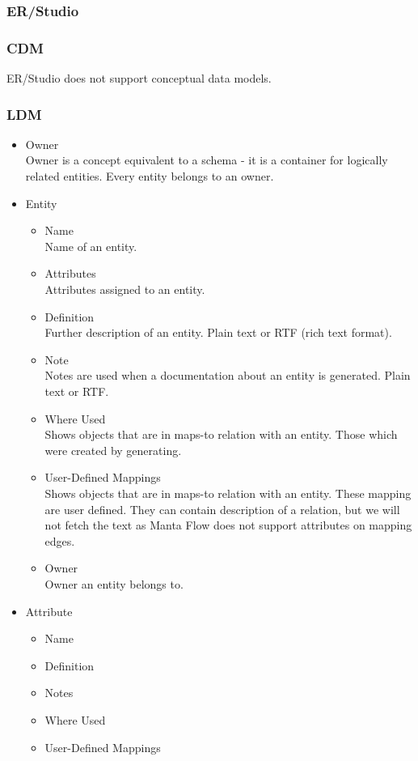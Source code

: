 \subsubsection{ER/Studio}

\subsubsection{CDM}

ER/Studio does not support conceptual data models.

\subsubsection{LDM}

\begin{itemize}
	\item Owner \\ 
	Owner is a concept equivalent to a schema - it is a container for logically related entities. Every entity belongs to an owner.
	\item Entity \\
	\begin{itemize}
		\item Name \\ 
		Name of an entity.
		\item Attributes \\ 
		Attributes assigned to an entity.
		\item Definition \\
		Further description of an entity. Plain text or RTF (rich text format).
		\item Note \\
		Notes are used when a documentation about an entity is generated. Plain text or RTF.
		\item Where Used \\
		Shows objects that are in maps-to relation with an entity. Those which were created by generating.
		\item User-Defined Mappings \\
		Shows objects that are in maps-to relation with an entity. These mapping are user defined. They can contain description of a relation, but we will not fetch the text as Manta Flow does not support attributes on mapping edges.
		\item Owner \\ 
		Owner an entity belongs to.
	\end{itemize}
	\item Attribute
	\begin{itemize}
		\item Name
		\item Definition
		\item Notes
		\item Where Used
		\item User-Defined Mappings
	\end{itemize}
\end{itemize}


